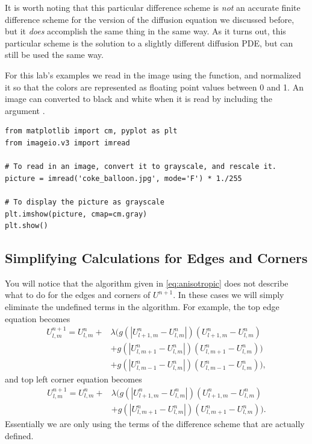 It is worth noting that this particular difference scheme is \textit{not} an accurate finite difference scheme for the version of the diffusion equation we discussed before, but it \textit{does} accomplish the same thing in the same way.
As it turns out, this particular scheme is the solution to a slightly different diffusion PDE, but can still be used the same way.

For this lab's examples we read in the image using the  function, and normalized it so that the colors are represented as floating point values between 0 and 1.
An image can converted to black and white when it is read by including the argument .

\begin{lstlisting}
from matplotlib import cm, pyplot as plt
from imageio.v3 import imread

# To read in an image, convert it to grayscale, and rescale it.
picture = imread('coke_balloon.jpg', mode='F') * 1./255

# To display the picture as grayscale
plt.imshow(picture, cmap=cm.gray)
plt.show()
\end{lstlisting}

\subsection*{Simplifying Calculations for Edges and Corners}\label{sec:simp}

You will notice that the algorithm given in \eqref{eq:anisotropic} does not describe what to do for the edges and corners of $U^{n+1}$.
In these cases we will simply eliminate the undefined terms in the algorithm.
For example, the top edge equation becomes
\begin{align*}
U_{l,m}^{n+1} = U_{l,m}^n + & \lambda (g(|U_{l+1,m}^n - U_{l,m}^n|)(U_{l+1,m}^n - U_{l,m}^n) \\
                    & + g(|U_{l,m+1}^n - U_{l,m}^n|)(U_{l,m+1}^n - U_{l,m}^n)) \\
					& + g(|U_{l,m-1}^n - U_{l,m}^n|)(U_{l,m-1}^n - U_{l,m}^n)),
\end{align*}
and top left corner equation becomes
\begin{align*}
U_{l,m}^{n+1} = U_{l,m}^n + & \lambda (g(|U_{l+1,m}^n - U_{l,m}^n|)(U_{l+1,m}^n - U_{l,m}^n) \\
					& + g(|U_{l,m+1}^n - U_{l,m}^n|)(U_{l,m+1}^n - U_{l,m}^n)).
\end{align*}
Essentially we are only using the terms of the difference scheme that are actually defined.


